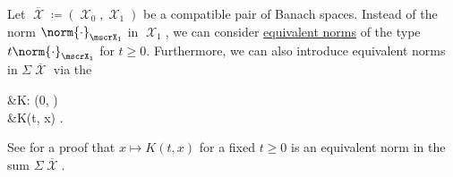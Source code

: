 \begin{definition}\label{def:k_functional}
  Let \( \overline{\mscrX} \coloneqq ( \mscrX_0, \mscrX_1 ) \) be a compatible pair of Banach spaces. Instead of the norm \( \norm{\cdot}_{\mscrX_1} \) in \( \mscrX_1 \), we can consider \hyperref[def:equivalent_metrics]{equivalent norms} of the type \( t\norm{\cdot}_{\mscrX_1} \) for \( t \geq 0 \). Furthermore, we can also introduce equivalent norms in \( \Sigma \overline{\mscrX} \) via the 
  \begin{alignedeq}\label{eq:def:k_functional}
    &K: (0, \infty) \times {\Sigma \overline{\mscrX}} \\
    &K(t, x) \coloneqq \inf {}.
  \end{alignedeq}

  See  for a proof that \( x \mapsto K(t, x) \) for a fixed \( t \geq 0 \) is an equivalent norm in the sum \( \Sigma \overline{\mscrX} \).
\end{definition}

